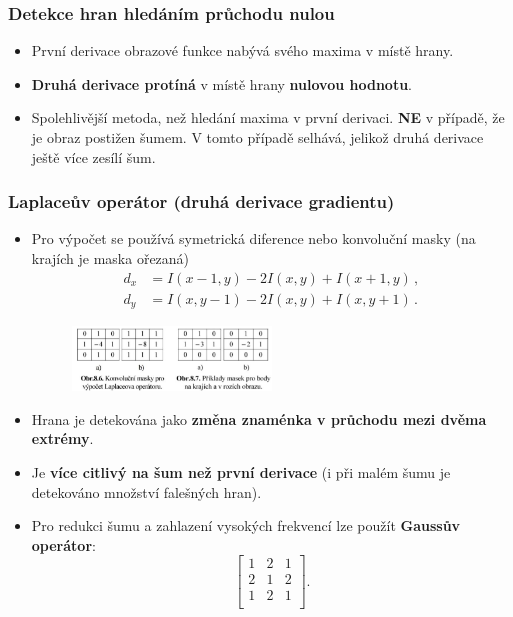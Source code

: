 \subsubsection{Detekce hran hledáním průchodu nulou}
\begin{itemize}
	\item První derivace obrazové funkce nabývá svého maxima v místě hrany.
	\item \textbf{Druhá derivace protíná} v místě hrany \textbf{nulovou hodnotu}.
	\item Spolehlivější metoda, než hledání maxima v první derivaci. \textbf{NE} v případě, že je obraz postižen šumem. V tomto případě selhává, jelikož druhá derivace ještě více zesílí šum.
\end{itemize}
\subsubsection*{Laplaceův operátor (druhá derivace gradientu)}
\begin{itemize}
	\item Pro výpočet se používá symetrická diference nebo konvoluční masky (na krajích je maska ořezaná)
	\begin{equation*}
	\begin{split}
	d_x &= I(x - 1, y) - 2I(x, y) + I(x + 1, y) \, ,\\
	d_y&= I(x, y - 1) - 2I(x, y) + I(x, y + 1) \, .
	\end{split}
	\end{equation*}
	 		\begin{figure}[H]
 	\begin{center}
	\includegraphics[width=0.5\textwidth]{assets/8_priklady_laplace}
	\end{center}
	\end{figure}
	\item Hrana je detekována jako \textbf{změna znaménka v průchodu mezi dvěma extrémy}.
	\item Je \textbf{více citlivý na šum než první derivace} (i při malém šumu je detekováno množství falešných hran).
	\item Pro redukci šumu a zahlazení vysokých frekvencí lze použít \textbf{Gaussův operátor}:
			\begin{equation*}
	 			\begin{bmatrix}
     			 1 &  2  &  1      \\[0.3em]
     			 2 &  1  &  2      \\[0.3em]
     			 1 &  2  &  1      \\
     			\end{bmatrix}.
			\end{equation*}
\end{itemize}
